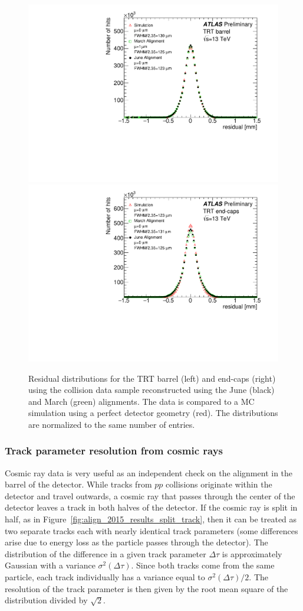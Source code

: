 \begin{figure}[htbp]
  \centering
  \includegraphics[width=.48\textwidth]{figs/alignment/align2015/TRTR}
  \includegraphics[width=.48\textwidth]{figs/alignment/align2015/TRTEC}
  \caption{Residual distributions for the TRT barrel (left) and end-caps (right) using the  collision data sample reconstructed using the June (black) and March (green) alignments.  The data is compared to a MC simulation using a perfect detector geometry (red).  The distributions are normalized to the same number of entries.}
  \label{fig:align_2015_results_trt}
\end{figure}
\FloatBarrier

\subsubsection{Track parameter resolution from cosmic rays}\label{align:2015_results_cosmic}
Cosmic ray data is very useful as an independent check on the alignment in the barrel of the detector.
While tracks from $pp$ collisions originate within the detector and travel outwards, a cosmic ray that passes through the center of the detector leaves a track in both halves of the detector.
If the cosmic ray is split in half, as in Figure~\ref{fig:align_2015_results_split_track}, then it can be treated as two separate tracks each with nearly identical track parameters (some differences arise due to energy loss as the particle passes through the detector).
The distribution of the difference in a given track parameter $\Delta\tau$ is approximately Gaussian with a variance $\sigma^2(\Delta\tau)$.
Since both tracks come from the same particle, each track individually has a variance equal to $\sigma^2(\Delta\tau)/2$.
The resolution of the track parameter is then given by the root mean square of the distribution divided by $\sqrt{2}$.

